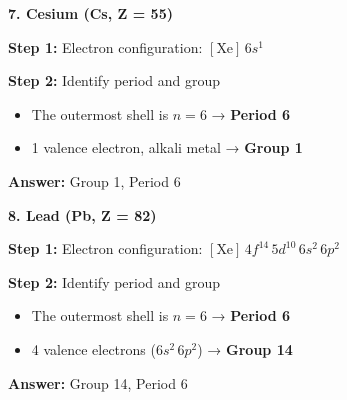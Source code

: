 \begin{exercise}
\begin{solu}
        \textbf{7. Cesium (Cs, Z = 55)}

        \textbf{Step 1:} Electron configuration: \([\text{Xe}] \, 6s^1\)

        \textbf{Step 2:} Identify period and group
        \begin{itemize}
            \item The outermost shell is \(n = 6\) → \textbf{Period 6}
            \item 1 valence electron, alkali metal → \textbf{Group 1}
        \end{itemize}

        \textbf{Answer:} Group 1, Period 6

        \textbf{8. Lead (Pb, Z = 82)}

        \textbf{Step 1:} Electron configuration: \([\text{Xe}] \, 4f^{14} \, 5d^{10} \, 6s^2 \, 6p^2\)

        \textbf{Step 2:} Identify period and group
        \begin{itemize}
            \item The outermost shell is \(n = 6\) → \textbf{Period 6}
            \item 4 valence electrons (\(6s^2 \, 6p^2\)) → \textbf{Group 14}
        \end{itemize}

        \textbf{Answer:} Group 14, Period 6


\end{solu}
\end{exercise}
